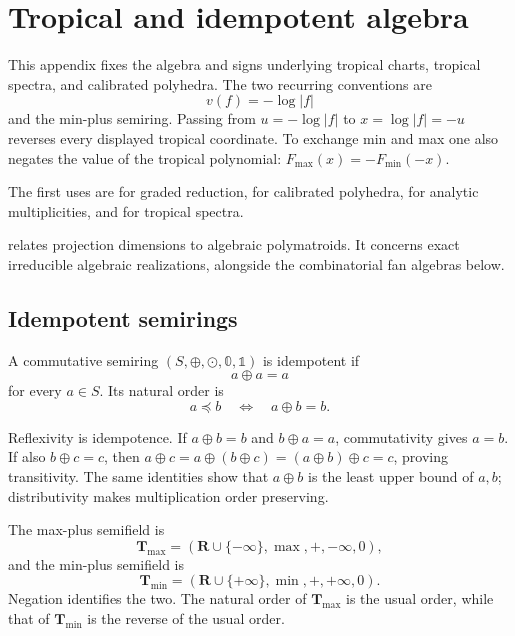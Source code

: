 \chapter{Tropical and idempotent algebra}
\label{app:tropical-algebra}

This appendix fixes the algebra and signs underlying tropical charts,
tropical spectra, and calibrated polyhedra.
The two recurring conventions are
\[
                       v(f)=-\log|f|
\]
and the min-plus semiring.
Passing from \(u=-\log|f|\) to \(x=\log|f|=-u\) reverses every displayed
tropical coordinate.  To exchange min and max one also negates the value of
the tropical polynomial: \(F_{\max}(x)=-F_{\min}(-x)\).

The first uses are  for graded reduction,
 for calibrated polyhedra,
 for analytic multiplicities,
and  for tropical spectra.

 relates projection dimensions
to algebraic polymatroids. It concerns exact irreducible algebraic
realizations, alongside the combinatorial fan algebras below.

\section{Idempotent semirings}
\label{sec:appG-idempotent}

\begin{definition}
\label{def:appG-idempotent}
A commutative semiring
\((S,\oplus,\odot,\mathbb0,\mathbb1)\) is idempotent if
\[
                              a\oplus a=a
\tag{G.1}\label{eq:appG-idempotence}
\]
for every \(a\in S\).
Its natural order is
\[
                       a\preceq b
                       \quad\Longleftrightarrow\quad
                       a\oplus b=b.
\tag{G.2}\label{eq:appG-natural-order}
\]
\end{definition}

Reflexivity is idempotence.  If \(a\oplus b=b\) and \(b\oplus a=a\),
commutativity gives \(a=b\).  If also \(b\oplus c=c\), then
\(a\oplus c=a\oplus(b\oplus c)=(a\oplus b)\oplus c=c\), proving
transitivity.  The same identities show that \(a\oplus b\) is the least
upper bound of \(a,b\); distributivity makes multiplication order preserving.

\begin{example}
\label{ex:appG-max-min}
The max-plus semifield is
\[
 \mathbf T_{\max}
 =(\mathbf R\cup\{-\infty\},\max,+,-\infty,0),
\tag{G.3}\label{eq:appG-max-plus}
\]
and the min-plus semifield is
\[
 \mathbf T_{\min}
 =(\mathbf R\cup\{+\infty\},\min,+,+\infty,0).
\tag{G.4}\label{eq:appG-min-plus}
\]
Negation identifies the two.
The natural order of \(\mathbf T_{\max}\) is the usual order, while that of
\(\mathbf T_{\min}\) is the reverse of the usual order.
\end{example}

